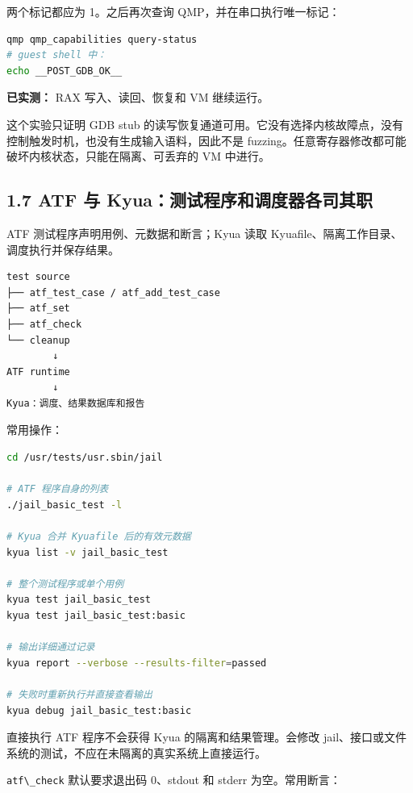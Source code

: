 \documentclass[
  11pt,
  UTF8,
  a4paper,
  fontset=fandol]{ctexart}
\newcommand{\passthrough}[1]{#1}
\begin{document}
两个标记都应为 1。之后再次查询 QMP，并在串口执行唯一标记：

\begin{lstlisting}[language=sh]
qmp qmp_capabilities query-status
# guest shell 中：
echo __POST_GDB_OK__
\end{lstlisting}

\textbf{已实测：} RAX 写入、读回、恢复和 VM 继续运行。

这个实验只证明 GDB stub
的读写恢复通道可用。它没有选择内核故障点，没有控制触发时机，也没有生成输入语料，因此不是
fuzzing。任意寄存器修改都可能破坏内核状态，只能在隔离、可丢弃的 VM
中进行。

\subsection{1.7 ATF 与
Kyua：测试程序和调度器各司其职}\label{atf-ux4e0e-kyuaux6d4bux8bd5ux7a0bux5e8fux548cux8c03ux5ea6ux5668ux5404ux53f8ux5176ux804c}

ATF 测试程序声明用例、元数据和断言；Kyua 读取
Kyuafile、隔离工作目录、调度执行并保存结果。

\begin{lstlisting}
test source
├── atf_test_case / atf_add_test_case
├── atf_set
├── atf_check
└── cleanup
        ↓
ATF runtime
        ↓
Kyua：调度、结果数据库和报告
\end{lstlisting}

常用操作：

\begin{lstlisting}[language=sh]
cd /usr/tests/usr.sbin/jail

# ATF 程序自身的列表
./jail_basic_test -l

# Kyua 合并 Kyuafile 后的有效元数据
kyua list -v jail_basic_test

# 整个测试程序或单个用例
kyua test jail_basic_test
kyua test jail_basic_test:basic

# 输出详细通过记录
kyua report --verbose --results-filter=passed

# 失败时重新执行并直接查看输出
kyua debug jail_basic_test:basic
\end{lstlisting}

直接执行 ATF 程序不会获得 Kyua 的隔离和结果管理。会修改
jail、接口或文件系统的测试，不应在未隔离的真实系统上直接运行。

\passthrough{\lstinline!atf\_check!} 默认要求退出码 0、stdout 和 stderr
为空。常用断言：
\end{document}
